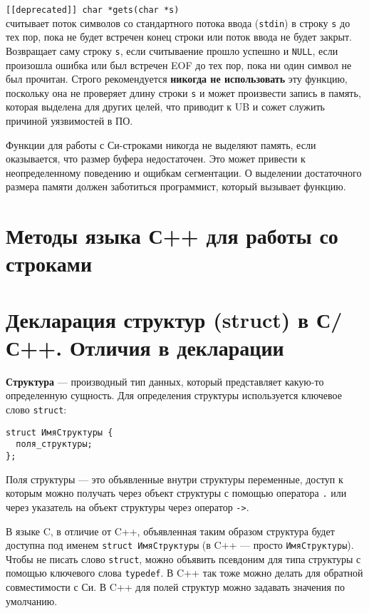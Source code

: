 \verb|[[deprecated]] char *gets(char *s)|\\
считывает поток символов со стандартного потока ввода (\verb|stdin|)
в строку \verb|s| до тех пор, пока не будет встречен конец строки или
поток ввода не будет закрыт. Возвращает саму строку \verb|s|, если
считываение прошло успешно и \verb|NULL|, если произошла ошибка или
был встречен EOF до тех пор, пока ни один символ не был прочитан.
Строго рекомендуется \textbf{никогда не использовать} эту функцию,
поскольку она не проверяет длину строки \verb|s| и может произвести
запись в память, которая выделена для других целей, что приводит к
UB и сожет служить причиной уязвимостей в ПО.

\vspace{1cm}

Функции для работы с Си-строками никогда не выделяют память, если оказывается, что размер буфера недостаточен. Это 
может привести к неопределенному поведению и ощибкам сегментации. О выделении
достаточного размера памяти должен заботиться программист, который вызывает функцию.

\section{Методы языка С++ для работы со строками}

\section{Декларация структур (struct) в С/С++. Отличия в декларации}
\textbf{Структура} \label{def:struct} --- производный тип данных, который представляет какую-то определенную сущность.
Для определения структуры используется ключевое слово \verb|struct|:

\begin{verbatim}
struct ИмяСтруктуры {
  поля_структуры;
};
\end{verbatim}
Поля структуры --- это объявленные внутри структуры переменные, доступ к которым можно получать через объект структуры
с помощью оператора \verb|.| или через указатель на объект структуры через оператор \verb|->|.

В языке C, в отличие от C++, объявленная таким образом структура будет доступна под именем
\verb|struct ИмяСтруктуры| (в C++ --- просто \verb|ИмяСтруктуры|). Чтобы не писать слово
\verb|struct|, можно объявить псевдоним для типа структуры с помощью ключевого слова
\verb|typedef|. В C++ так тоже можно делать для обратной совместимости с Си. В C++
для полей структур можно задавать значения по умолчанию.

